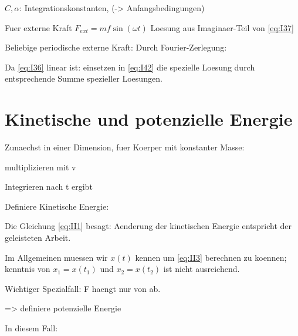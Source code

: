
$C, \alpha$: Integrationskonstanten, (-> Anfangsbedingungen)

Fuer externe Kraft $F_{ext} = m f \sin(\omega t)$ Loesung aus Imaginaer-Teil von \ref{eq:I37}

Beliebige periodische externe Kraft: Durch Fourier-Zerlegung:

Da \ref{eq:I36} linear ist: einsetzen in \ref{eq:I42} die spezielle Loesung durch entsprechende Summe spezieller Loesungen.

\section{Kinetische und potenzielle Energie}

Zunaechst in einer Dimension, fuer Koerper mit konstanter Masse:


multiplizieren mit v


Integrieren nach t ergibt


Definiere Kinetische Energie:

Die Gleichung \ref{eq:II1} besagt: Aenderung der kinetischen Energie entspricht der geleisteten Arbeit.


Im Allgemeinen muessen wir $x(t)$ kennen um \ref{eq:II3} berechnen zu koennen; kenntnis von $x_1 = x(t_1)$ und $x_2 = x(t_2)$ ist nicht ausreichend. 

Wichtiger Spezialfall: F haengt nur von  ab.

=> definiere potenzielle Energie 

In diesem Fall:

